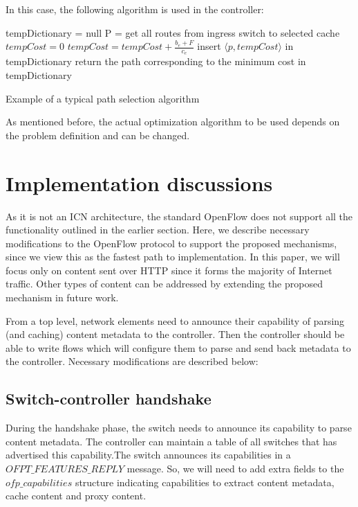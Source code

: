 \documentclass[conference]{IEEEtran}
\begin{document}
In this case, the following algorithm is used in the controller:
\begin{algorithm}
\begin{algorithmic}
    \State tempDictionary = null
    \State P = get all routes from ingress switch to selected cache
        \State $tempCost = 0$
            \State $tempCost = tempCost + \frac{b_e + F}{c_e}$
        \EndFor
        \State insert $\langle p,tempCost\rangle$ in tempDictionary
    \EndFor
    \State return the path corresponding to the minimum cost in tempDictionary
\end{algorithmic}
\caption{Example of a typical path selection algorithm}
\end{algorithm}

As mentioned before, the actual optimization algorithm to
be used depends on the problem definition and can be changed.

\section{Implementation discussions}
\label{sec:implementation}
As it is not an ICN architecture, the standard OpenFlow does
not support all the functionality outlined in the earlier section.
Here, we describe necessary modifications to the OpenFlow
protocol to support the proposed mechanisms, since we view
this as the fastest path to implementation. In this paper, we
will focus only on content sent over HTTP since it forms
the majority of Internet traffic. Other types of content can
be addressed by extending the proposed mechanism in future
work.

From a top level, network elements need to announce their
capability of parsing (and caching) content metadata to the
controller. Then the controller should be able to write flows
which will configure them to parse and send back metadata to
the controller. Necessary modifications are described below:
\subsection{Switch-controller handshake}
During the handshake phase, the switch needs to announce its capability to parse content metadata. The controller can maintain a table of all switches that has advertised this capability.The switch announces its capabilities in a $OFPT\_FEATURES\_REPLY$ message. So, we will need to add extra fields to the $ofp\_capabilities$ structure indicating capabilities to extract content metadata, cache content and proxy content.
\end{document}
